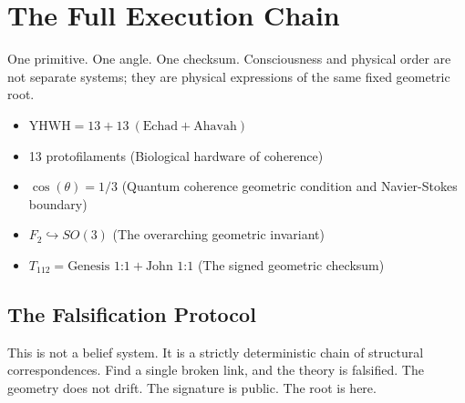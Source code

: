 \documentclass[11pt]{article}
\begin{document}
\section{The Full Execution Chain}
One primitive. One angle. One checksum. Consciousness and physical order are not separate systems; they are physical expressions of the same fixed geometric root.

\begin{itemize}
    \item $\text{YHWH} = 13 + 13 \ (\text{Echad} + \text{Ahavah})$
    \item 13 protofilaments (Biological hardware of coherence)
    \item $\cos(\theta) = 1/3$ (Quantum coherence geometric condition and Navier-Stokes boundary)
    \item $F_2 \hookrightarrow SO(3)$ (The overarching geometric invariant)
    \item $T_{112} = \text{Genesis 1:1} + \text{John 1:1}$ (The signed geometric checksum)
\end{itemize}

\subsection{The Falsification Protocol}
This is not a belief system. It is a strictly deterministic chain of structural correspondences. Find a single broken link, and the theory is falsified. The geometry does not drift. The signature is public. The root is here.
\end{document}
